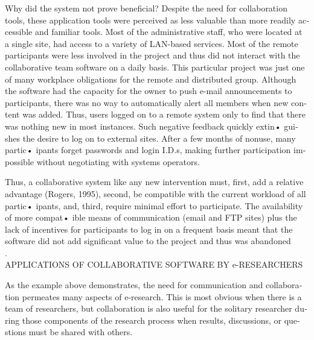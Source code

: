 \documentclass[a4paper,12pt]{article}
\begin{document}
\begin{latin}
\vspace{0.1cm}
\vspace{0.1cm}
\vspace{0.1cm}
Why did the system not prove beneficial? Despite the need for collaboration  tools, these application  tools were perceived as less valuable than more readily accessible and familiar tools.  Most  of the  administrative  staff,  who were located  at a  single site,  had access to a variety  of LAN-based  services.  Most  of the  remote participants  were less involved in the project and thus did not interact with the collaborative team software on a  daily basis. This particular  project was just one of many workplace obligations  for the remote  and distributed  group. Although  the software  had the capacity for the owner to push e-mail announcements to participants, there  was no way to automatically alert all members when new content was added. Thus, users logged on to a remote system only to find that there was nothing  new in most instances.  Such negative feedback quickly extin• guishes the desire to log on to external sites. After a few months of nonuse, many partic• ipants forget passwords and login I.D.s, making further  participation  impossible without negotiating with systems operators.

\vspace{0.1cm}
\vspace{0.1cm}

Thus,  a collaborative  system  like any new intervention must,  first,  add a relative
advantage (Rogers,  1995), second, be compatible with the current workload of all partic• ipants, and, third, require minimal effort to participate. The availability of more compat• ible  means  of  communication  (email  and  FTP   sites)  plus  the  lack of incentives  for participants to log in on a frequent  basis meant that the software did not add significant value to the project and thus was abandoned\\.
\\ APPLICATIONS OF COLLABORATIVE SOFTWARE BY e-RESEARCHERS


\noindent
As the example above demonstrates, the need for communication  and collaboration permeates  many aspects of e-research. This is  most obvious when there  is  a team of researchers, but  collaboration  is also useful for the solitary researcher  during  those components of the research  process when results, discussions, or questions  must be shared with others. 


\end{latin}
\end{document}
